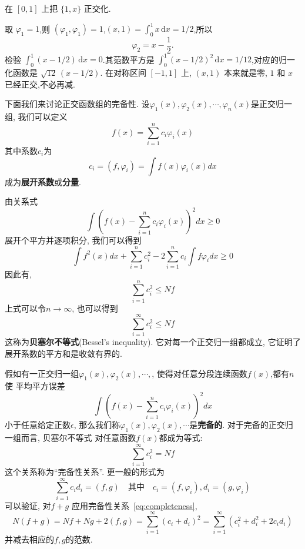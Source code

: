 \begin{example}
在 $[0,1]$ 上把 $\{1,x\}$ 正交化.
\end{example}
\begin{solution}
取 $\varphi_1=1$,则 $(\varphi_1,\varphi_1)=1$,$(x,1)=\int_0^1 x\,\mathrm{d}x=1/2$,所以
\begin{equation}
  \varphi_2 = x - \frac12 .
\end{equation}
检验 $\int_0^1 (x-1/2)\,\mathrm{d}x=0$.其范数平方是 $\int_0^1 (x-1/2)^2\,\mathrm{d}x=1/12$,对应的归一化函数是 $\sqrt{12}\,(x-1/2)$.
在对称区间 $[-1,1]$ 上, $(x,1)$ 本来就是零, $1$ 和 $x$ 已经正交,不必再减.
\end{solution}

下面我们来讨论正交函数组的完备性. 设$\varphi_1(x), \varphi_2(x), \cdots, \varphi_n(x)$是正交归一组, 我们可以定义
\begin{equation}
  f(x) = \sum_{i=1}^n c_i \varphi_i(x)
\end{equation}
其中系数$c_i$为
\begin{equation}
  c_i = (f, \varphi_i) = \int f(x) \varphi_i(x) dx
\end{equation}
成为\textbf{展开系数}或\textbf{分量}.

由关系式
\begin{equation}
  \int \left( f(x) - \sum_{i=1}^n c_i \varphi_i(x) \right)^2 dx \geq  0
\end{equation}
展开个平方并逐项积分, 我们可以得到
\begin{equation}
 \int f^2(x) dx +  \sum_{i=1}^n c_i^2  -  2 \sum_{i=1}^n   c_i \int f  \varphi_i  dx \geq 0 
\end{equation}
因此有,
\begin{equation}
  \sum_{i=1}^n c_i^2 \leq N f 
\end{equation}
上式可以令$n \to \infty$, 也可以得到
\begin{equation}
  \sum_{i=1}^{\infty} c_i^2 \leq N f
\end{equation}
这称为\textbf{贝塞尔不等式}(Bessel's inequality). 它对每一个正交归一组都成立, 它证明了展开系数的平方和是收敛有界的.

假如有一正交归一组$\varphi_1(x), \varphi_2(x), \cdots, $, 使得对任意分段连续函数$f(x)$,都有$n$使
平均平方误差
$$
\int \left( f(x) - \sum_{i=1}^n c_i \varphi_i(x) \right)^2 dx 
$$
小于任意给定正数$\epsilon$, 那么我们称$\varphi_1(x), \varphi_2(x), \cdots$是\textbf{完备的}. 对于完备的正交归一组而言, 贝塞尔不等式
对任意函数$f(x)$都成为等式:
\begin{equation}
  \sum_{i=1}^{\infty} c_i^2 = N f
  \label{eq:completeness}
\end{equation}
这个关系称为``完备性关系''. 更一般的形式为
\begin{equation}
  \sum_{i=1}^{\infty} c_i d_i = (f, g) \quad \text{其中} \quad  c_i = (f, \varphi_i) , d_i = (g, \varphi_i)
\end{equation}
可以验证, 对$f+g$ 应用完备性关系~\ref{eq:completeness},
\begin{equation}
  N (f + g) = Nf  + Ng + 2 (f, g) = \sum_{i = 1}^{\infty} (c_i + d_i)^2 = \sum_{i=1}^{\infty} (c_i^2 + d_i^2 + 2  c_i d_i) 
\end{equation}
并减去相应的$f,g$的范数.

